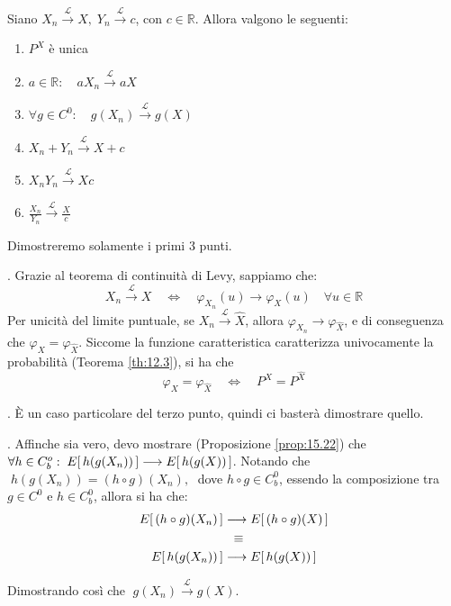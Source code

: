 \begin{teorema}
    Siano $X_n\overset{\mathcal{L}}{\longrightarrow} X,\; Y_n\overset{\mathcal{L}}{\longrightarrow} c$, con $c\in \mathbb{R}$. Allora valgono le seguenti:
    \begin{enumerate}
        \item $P^X$ è unica
        \item $a\in\mathbb{R}:\quad aX_n\overset{\mathcal{L}}{\longrightarrow} aX$
        \item $\forall g\in C^0:\quad g(X_n)\overset{\mathcal{L}}{\longrightarrow} g(X)$
        \item $X_n+Y_n\overset{\mathcal{L}}{\longrightarrow} X + c$
        \item $X_n Y_n\overset{\mathcal{L}}{\longrightarrow} X c$
        \item $\frac{X_n}{Y_n}\overset{\mathcal{L}}{\longrightarrow} \frac{X}{c}$
    \end{enumerate}
\end{teorema}
    \begin{dimostrazione}
        Dimostreremo solamente i primi 3 punti. 

        . Grazie al teorema di continuità di Levy, sappiamo che:
        \[X_n \overset{\mathcal{L}}{\longrightarrow} X \quad \iff\quad \varphi_{X_n} (u)\longrightarrow \varphi_X(u)  \quad \forall u \in\mathbb{R}\]
        Per unicità del limite puntuale, se $X_n \overset{\mathcal{L}}{\longrightarrow} \widehat{X}$, allora $\varphi_{X_n}\longrightarrow\varphi_{\widehat{X}}$, e di conseguenza che $\varphi_X = \varphi_{\widehat{X}}$. Siccome la funzione caratteristica caratterizza univocamente la probabilità (Teorema \ref{th:12.3}), si ha che
        \[\varphi_X = \varphi_{\widehat{X}}\quad \iff \quad P^X = P^{\widehat{X}}\]

        . È un caso particolare del terzo punto, quindi ci basterà dimostrare quello.

        . Affinche sia vero, devo mostrare (Proposizione \ref{prop:15.22}) che $\forall h\in C^o_b:\;E\!\left[\,h(g(X_n))\,\right]\longrightarrow E\!\left[\,h(g(X))\,\right]$. Notando che $\;h(g(X_n)) = (h\circ g)(X_n), \;$ dove $h\circ g\in C^0_b$, essendo la composizione tra $g\in C^0$ e $h\in C^0_b$, allora si ha che:
        \begin{align*}
            E\!\left[\,(h\circ g)(X_n)\,\right] &\longrightarrow E\!\left[\,(h\circ g)(X)\,\right]\\
            &\;\;\equiv\\
            E\!\left[\,h(g(X_n))\,\right] & \longrightarrow E\!\left[\,h(g(X))\,\right]
        \end{align*}

        Dimostrando così che $\;g(X_n)\overset{\mathcal{L}}{\longrightarrow}g(X)$.
    \end{dimostrazione}

